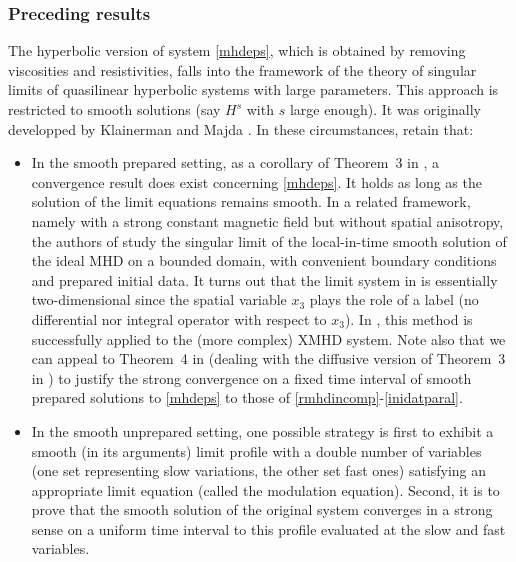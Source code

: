 \documentclass[11pt,reqno]{amsart}
\begin{document}
\subsubsection{Preceding results}\label{sss:preceding}
The hyperbolic version of system \eqref{mhdeps}, which is obtained by removing  viscosities and  resistivities, falls into the framework of the theory of singular limits of quasilinear hyperbolic systems with large parameters. This approach is restricted to smooth solutions (say $ H^s $ with $ s $ large enough). It was originally developped by Klainerman and Majda \cite{KM81, Maj84}. In these circumstances, retain that:
\begin{itemize}
\item In the smooth prepared setting, as a corollary of Theorem~3 in  \cite{KM81}, a convergence result does exist \cite{Gui15} concerning \eqref{mhdeps}. It holds as long as the solution of the limit equations remains smooth. In a related framework, namely with a strong constant magnetic field but without spatial anisotropy, the authors of \cite{JSX19} study the singular limit of the local-in-time smooth solution of the ideal MHD on a bounded domain, with convenient boundary conditions and prepared initial data. It turns out that the limit system in  \cite{JSX19} is essentially two-dimensional since the spatial variable $x_3$ plays the role of a label (no differential nor integral operator with respect to $x_3$). In \cite{BC2}, this method is successfully applied to the (more complex) XMHD system. Note also that we can appeal to Theorem~4 in \cite{KM81} (dealing with the diffusive version of Theorem~3 in \cite{KM81}) to justify the strong convergence on a fixed time interval of smooth prepared solutions to \eqref{mhdeps} to those of \eqref{rmhdincomp}-\eqref{inidatparal}. 
  
 \item In the smooth unprepared setting, one possible strategy \cite{Sch94} is first to exhibit a smooth (in its arguments) limit profile with a double number of variables (one set representing slow variations, the other set fast ones) satisfying an appropriate limit equation (called the modulation equation). Second, it is to prove that the smooth solution of the original system converges in a strong sense on a uniform time interval to this profile evaluated at the slow and fast variables.
\end{itemize}
\end{document}
